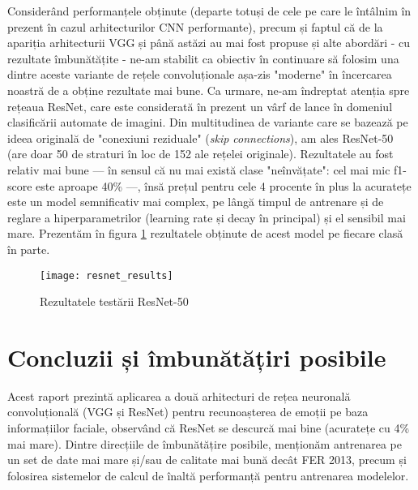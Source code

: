 \documentclass{article}
\begin{document}
Considerând performanțele obținute (departe totuși de cele pe care le întâlnim în prezent în cazul arhitecturilor CNN performante), precum și faptul că de la apariția arhitecturii VGG și până astăzi au mai fost propuse și alte abordări - cu rezultate îmbunătățite - ne-am stabilit ca obiectiv în continuare să folosim una dintre aceste variante de rețele convoluționale așa-zis "moderne" în încercarea noastră de a obține rezultate mai bune. Ca urmare, ne-am îndreptat atenția spre rețeaua ResNet, care este considerată în prezent un vârf de lance în domeniul clasificării automate de imagini. Din multitudinea de variante care se bazează pe ideea originală de "conexiuni reziduale" (\textit{skip connections}), am ales ResNet-50 (are doar 50 de straturi în loc de 152 ale rețelei originale). Rezultatele au fost relativ mai bune --- în sensul că nu mai există clase "neînvățate": cel mai mic f1-score este aproape 40\% ---, însă prețul pentru cele 4 procente în plus la acuratețe este un model semnificativ mai complex, pe lângă timpul de antrenare și de reglare a hiperparametrilor (learning rate și decay în principal) și el sensibil mai mare. Prezentăm în figura \ref{resnet_test} rezultatele obținute de acest model pe fiecare clasă în parte.

\begin{figure}[t]
    \centering
    \texttt{[image: resnet\_results]}
    \caption{Rezultatele testării ResNet-50}
    \label{resnet_test}
\end{figure}

\section{Concluzii și îmbunătățiri posibile}
Acest raport prezintă aplicarea a două arhitecturi de rețea neuronală convoluțională (VGG și ResNet) pentru recunoașterea de emoții pe baza informațiilor faciale, observând că ResNet se descurcă mai bine (acuratețe cu 4\% mai mare). Dintre direcțiile de îmbunătățire posibile, menționăm antrenarea pe un set de date mai mare și/sau de calitate mai bună decât FER 2013, precum și folosirea sistemelor de calcul de înaltă performanță pentru antrenarea modelelor.
\end{document}
